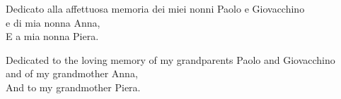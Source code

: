 \thispagestyle{empty}
{}

\vspace*{6cm}



Dedicato alla affettuosa memoria dei miei nonni Paolo e Giovacchino \\ 
e di mia nonna Anna, \\
E a mia nonna Piera.\bigskip
    
Dedicated to the loving memory of my grandparents Paolo and Giovacchino\\
and of my grandmother Anna,\\
And to my grandmother Piera.

